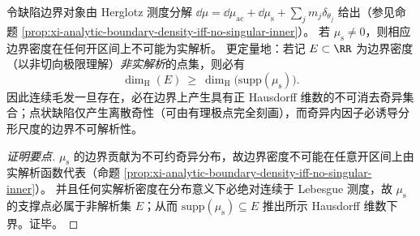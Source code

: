\begin{proposition}\label{con:discussion-singular-hair-hausdorff-lower-bound}
令缺陷边界对象由 Herglotz 测度分解
\(
\dd\mu=\dd\mu_{\mathrm{ac}}+\dd\mu_{\mathrm{s}}+\sum_j m_j\delta_{\theta_j}
\)
给出（参见命题 \ref{prop:xi-analytic-boundary-density-iff-no-singular-inner}）。
若 \(\mu_{\mathrm{s}}\neq 0\)，则相应边界密度在任何开区间上不可能为实解析。
更定量地：若记 \(E\subset\RR\) 为边界密度（以非切向极限理解）\emph{非实解析}的点集，则必有
\[
\boxed{\;
\dim_{\mathrm{H}}(E)\ \ge\ \dim_{\mathrm{H}}\bigl(\mathrm{supp}(\mu_{\mathrm{s}})\bigr).\;}
\]
因此连续毛发一旦存在，必在边界上产生具有正 Hausdorff 维数的不可消去奇异集合；点状缺陷仅产生离散奇性（可由有理极点完全刻画），而奇异内因子必诱导分形尺度的边界不可解析性。
\end{proposition}
\begin{proof}[证明要点]
\(\mu_{\mathrm{s}}\) 的边界贡献为不可约奇异分布，故边界密度不可能在任意开区间上由实解析函数代表（命题 \ref{prop:xi-analytic-boundary-density-iff-no-singular-inner}）。
并且任何实解析密度在分布意义下必绝对连续于 Lebesgue 测度，故 \(\mu_{\mathrm{s}}\) 的支撑点必属于非解析集 \(E\)；从而 \(\mathrm{supp}(\mu_{\mathrm{s}})\subseteq E\) 推出所示 Hausdorff 维数下界。证毕。
\end{proof}

\par
